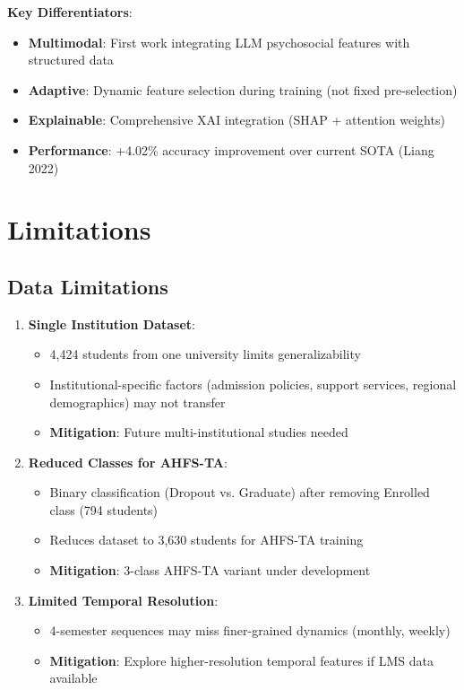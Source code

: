 \textbf{Key Differentiators}:
\begin{itemize}
\item \textbf{Multimodal}: First work integrating LLM psychosocial features with structured data
\item \textbf{Adaptive}: Dynamic feature selection during training (not fixed pre-selection)
\item \textbf{Explainable}: Comprehensive XAI integration (SHAP + attention weights)
\item \textbf{Performance}: +4.02\% accuracy improvement over current SOTA (Liang 2022)
\end{itemize}

\section{Limitations}

\subsection{Data Limitations}

\begin{enumerate}
\item \textbf{Single Institution Dataset}:
\begin{itemize}
\item 4,424 students from one university limits generalizability
\item Institutional-specific factors (admission policies, support services, regional demographics) may not transfer
\item \textbf{Mitigation}: Future multi-institutional studies needed
\end{itemize}

\item \textbf{Reduced Classes for AHFS-TA}:
\begin{itemize}
\item Binary classification (Dropout vs. Graduate) after removing Enrolled class (794 students)
\item Reduces dataset to 3,630 students for AHFS-TA training
\item \textbf{Mitigation}: 3-class AHFS-TA variant under development
\end{itemize}

\item \textbf{Limited Temporal Resolution}:
\begin{itemize}
\item 4-semester sequences may miss finer-grained dynamics (monthly, weekly)
\item \textbf{Mitigation}: Explore higher-resolution temporal features if LMS data available
\end{itemize}
\end{enumerate}

